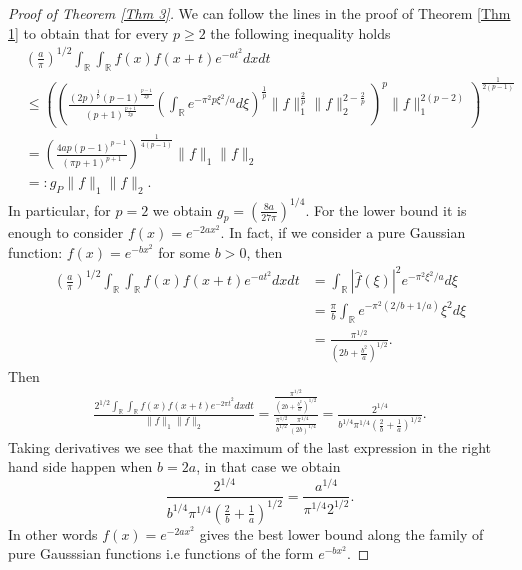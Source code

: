 \documentclass[11pt, reqno]{amsart}
\numberwithin{equation}{section}
\newcommand{\R}{{\mathbb R}}
\begin{document}
\begin{proof}[Proof of Theorem \ref{Thm 3}]
We can follow the lines in the proof of Theorem \ref{Thm 1} to obtain that for every $p\geq 2$ the following inequality holds
\begin{align*}
    &\left(\frac{a}{\pi}\right)^{1/2}\int_{\R}\int_{\R}f(x)f(x+t)e^{-a t^{2}}dxdt\\
    &\leq 
    \left(
    \left( \frac{(2p)^{\frac{1}{p}}(p-1)^{\frac{p-1}{2p}}}{(p+1)^{\frac{p+1}{2p}}}\left(\int_{\R} e^{-\pi^2 p\xi^{2}/a}d\xi\right)^{\frac{1}{p}}\|f\|^{\frac{2}{p}}_1\|f\|^{2-\frac{2}{p}}_2  
    \right)^{p}\|f\|^{2(p-2)}_1 \right)^{\frac{1}{2(p-1)}}\\
    &= \left(\frac{4ap(p-1)^{p-1}}{(\pi p+1)^{p+1}} \right)^{\frac{1}{4(p-1)}}\|f\|_1\|f\|_2\\
    &=:g_P\|f\|_1\|f\|_2.
\end{align*}
In particular, for $p=2$ we obtain $g_p= \left(\frac{8a}{27\pi}\right)^{1/4}$. For the lower bound it is enough to consider $f(x)=e^{-2a x^{2}}$. In fact, if we consider a pure Gaussian function: $f(x)=e^{-bx^2}$ for some $b>0$, then
\begin{align*}
    \left(\frac{a}{\pi}\right)^{1/2}\int_{\R}\int_{\R}f(x)f(x+t)e^{-a t^{2}}dxdt&=\int_{\R}|\hat f(\xi)|^{2}e^{-\pi^2 \xi^{2}/a}d\xi\\
    &=\frac{\pi}{b}\int_{\R}e^{-\pi^2(2/b+1/a)}\xi^2d\xi\\
    &=\frac{\pi^{1/2}}{(2b+\frac{b^2}{a})^{1/2}}.
\end{align*}
Then
\begin{align*}
    \frac{2^{1/2}\int_{\R}\int_{\R}f(x)f(x+t)e^{-2\pi t^{2}}dxdt}{\|f\|_1\|f\|_2}=\frac{\frac{\pi^{1/2}}{(2b+\frac{b^2}{a})^{1/2}}}{\frac{\pi^{1/2}}{b^{1/2}}\frac{\pi^{1/4}}{(2b)^{1/4}}}=\frac{2^{1/4}}{b^{1/4}\pi^{1/4}(\frac{2}{b}+\frac{1}{a})^{1/2}}.
\end{align*}
Taking derivatives we see that the maximum of the last expression in the right hand side happen when $b=2a$, in that case we obtain
$$
\frac{2^{1/4}}{b^{1/4}\pi^{1/4}(\frac{2}{b}+\frac{1}{a})^{1/2}}=\frac{a^{1/4}}{\pi^{1/4}2^{1/2}}.
$$
In other words $f(x)=e^{-2a x^{2}}$ gives the best lower bound along the family of pure Gausssian functions i.e functions of the form $e^{-bx^2}$.
\end{proof}
\end{document}
